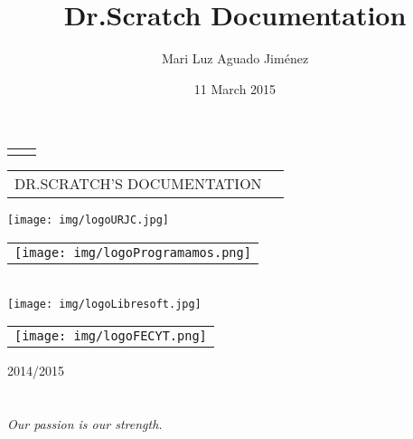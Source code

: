 \documentclass[a4paper, 12pt]{book}
\title{Dr.Scratch Documentation}
\author{Mari Luz Aguado Jiménez}
\date{11 March 2015}
\begin{document}
\renewcommand{\appendixname}{Apéndice}

\frontmatter
\begin{titlepage}
\begin{center}

\begin{tabular}[c]{c c}
\vspace{2cm}
\end{tabular}



\begin{tabular}[c]{c c}
\Huge
DR.SCRATCH'S DOCUMENTATION
\end{tabular}

\vspace{6cm}

\texttt{[image: img/logoURJC.jpg]}
\begin{tabular}[b]{l}
\texttt{[image: img/logoProgramamos.png]} 
\end{tabular}
\\
\texttt{[image: img/logoLibresoft.jpg]}
\begin{tabular}[b]{l}
\texttt{[image: img/logoFECYT.png]} 
\end{tabular}


\vspace{2.5cm}

\vspace{4cm}

\large
2014/2015
\end{center}
\end{titlepage}

\newpage
\mbox{}
\thispagestyle{empty} %

\chapter*{}
\begin{flushright}
\textit{Our passion is our strength.}
\end{flushright}


\tableofcontents  %
\cleardoublepage
\listoffigures %
\end{document}
